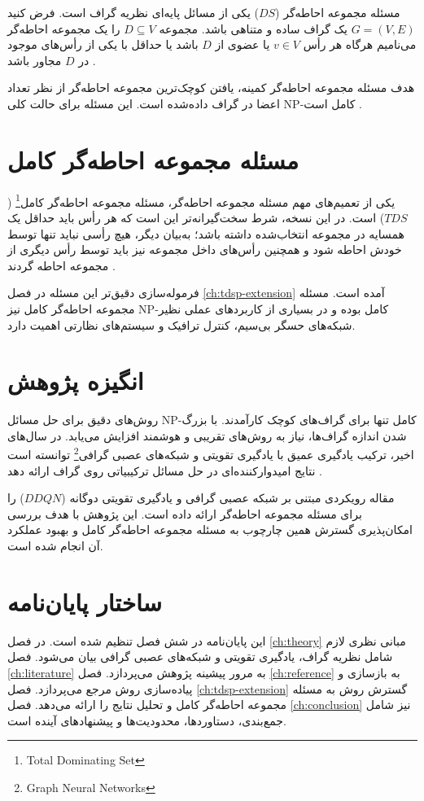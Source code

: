 مسئله مجموعه احاطه‌گر ($DS$) یکی از مسائل پایه‌ای نظریه گراف است. فرض کنید $G=(V,E)$ یک گراف ساده و متناهی باشد. مجموعه $D \subseteq V$ را یک مجموعه احاطه‌گر می‌نامیم هرگاه هر رأس $v \in V$ یا عضوی از $D$ باشد یا حداقل با یکی از رأس‌های موجود در $D$ مجاور باشد \cite{haynes1998fundamentals}.

هدف مسئله مجموعه احاطه‌گر کمینه، یافتن کوچک‌ترین مجموعه احاطه‌گر از نظر تعداد اعضا در گراف داده‌شده است. این مسئله برای حالت کلی NP-کامل است \cite{garey1979computers}.

\section{مسئله مجموعه احاطه‌گر کامل}

یکی از تعمیم‌های مهم مسئله مجموعه احاطه‌گر، مسئله مجموعه احاطه‌گر کامل\footnote{Total Dominating Set} ($TDS$) است. در این نسخه، شرط سخت‌گیرانه‌تر این است که هر رأس باید حداقل یک همسایه در مجموعه انتخاب‌شده داشته باشد؛ به‌بیان دیگر، هیچ رأسی نباید تنها توسط خودش احاطه شود و همچنین رأس‌های داخل مجموعه نیز باید توسط رأس دیگری از مجموعه احاطه گردند \cite{haynes1998fundamentals}.

فرموله‌سازی دقیق‌تر این مسئله در فصل \ref{ch:tdsp-extension} آمده است. مسئله مجموعه احاطه‌گر کامل نیز NP-کامل بوده و در بسیاری از کاربردهای عملی نظیر شبکه‌های حسگر بی‌سیم، کنترل ترافیک و سیستم‌های نظارتی اهمیت دارد.

\section{انگیزه پژوهش}

روش‌های دقیق برای حل مسائل NP-کامل تنها برای گراف‌های کوچک کارآمدند. با بزرگ شدن اندازه گراف‌ها، نیاز به روش‌های تقریبی و هوشمند افزایش می‌یابد. در سال‌های اخیر، ترکیب یادگیری عمیق با یادگیری تقویتی و شبکه‌های عصبی گرافی\footnote{Graph Neural Networks} توانسته است نتایج امیدوارکننده‌ای در حل مسائل ترکیبیاتی روی گراف ارائه دهد \cite{gilmer2017mpnn, khalil2017learning, bello2016neural}.

مقاله \cite{chen2024dsp} رویکردی مبتنی بر شبکه عصبی گرافی و یادگیری تقویتی دوگانه ($DDQN$) را برای مسئله مجموعه احاطه‌گر ارائه داده است. این پژوهش با هدف بررسی امکان‌پذیری گسترش همین چارچوب به مسئله مجموعه احاطه‌گر کامل و بهبود عملکرد آن انجام شده است.

\section{ساختار پایان‌نامه}

این پایان‌نامه در شش فصل تنظیم شده است. در فصل \ref{ch:theory} مبانی نظری لازم شامل نظریه گراف، یادگیری تقویتی و شبکه‌های عصبی گرافی بیان می‌شود. فصل \ref{ch:literature} به مرور پیشینه پژوهش می‌پردازد. فصل \ref{ch:reference} به بازسازی و پیاده‌سازی روش مرجع می‌پردازد. فصل \ref{ch:tdsp-extension} گسترش روش به مسئله مجموعه احاطه‌گر کامل و تحلیل نتایج را ارائه می‌دهد. فصل \ref{ch:conclusion} نیز شامل جمع‌بندی، دستاوردها، محدودیت‌ها و پیشنهادهای آینده است.
